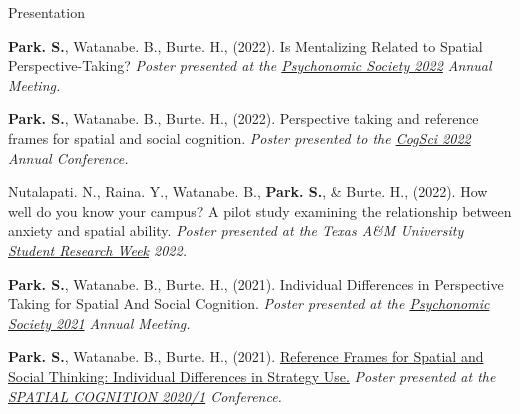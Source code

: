 \documentclass{resume} %
\begin{document}
\begin{rSection}{Presentation}
	\setlength{\hangingindent}{1.27cm}
	
	\begin{hangingpar}
		
		\textbf{Park. S.}, Watanabe. B., Burte. H., (2022). 
		Is Mentalizing Related to Spatial Perspective-Taking? 
		\em{Poster presented at the
			\href{https://www.psychonomic.org/page/2022annualmeeting}{Psychonomic
				Society 2022} Annual Meeting.}
		
	\end{hangingpar}
	
	\begin{hangingpar}
		
		\textbf{Park. S.}, Watanabe. B., Burte. H., (2022). 
		Perspective taking and reference frames for spatial and social 
		cognition. 
		\em{Poster presented to the
			\href{https://cognitivesciencesociety.org/cogsci-2022/}{CogSci 
				2022} Annual Conference.}
		
	\end{hangingpar}
	
	\begin{hangingpar}
		
		Nutalapati. N., Raina. Y., Watanabe. B., \textbf{Park. S.}, \& Burte. 
		H., (2022). 
		How well do you know your campus? A pilot study examining the 
		relationship between anxiety and spatial ability. 
		\em{Poster presented at the Texas A\&M University
			\href{https://srw.tamu.edu/}{Student Research Week} 2022.}
		
	\end{hangingpar}
	
	\begin{hangingpar}
		
		\textbf{Park. S.}, Watanabe. B., Burte. H., (2021). 
		Individual Differences in Perspective Taking for Spatial And Social Cognition. 
		\em{Poster presented at the
			\href{https://www.psychonomic.org/page/2021annualmeeting}{Psychonomic Society 2021} Annual Meeting.}
		
	\end{hangingpar}
	
	\begin{hangingpar}
		
		\textbf{Park. S.}, Watanabe. B., Burte. H., (2021). 
		\href{https://sc2020.lu.lv/wp-content/uploads/2021/08/spatialCog21Poster_SungjoonParkV2.pdf}{Reference Frames for Spatial and Social Thinking: 
			Individual Differences in Strategy Use.} 
		\em{Poster presented at the 
			\href{http://sc2020.lu.lv/}{SPATIAL COGNITION 2020/1} Conference.}
		

\end{hangingpar}
\end{rSection}
\end{document}
